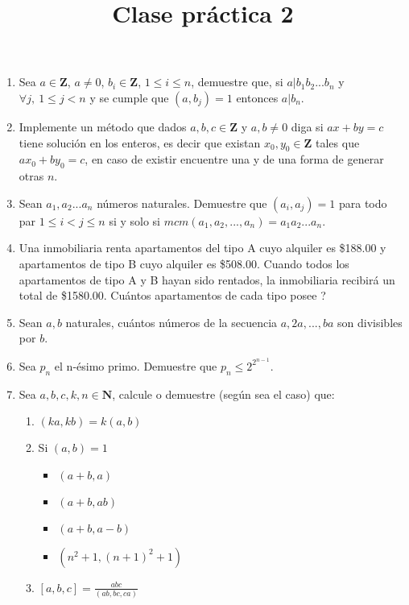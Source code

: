 \documentclass{article}
\begin{document}
\title{Clase pr\'actica 2}
\maketitle

\begin{enumerate}
    \item Sea $a \in \mathbf{Z}$, $a \neq 0$, $b_i \in \mathbf{Z}$, $1 \leq i \leq n$, demuestre que, si $a | b_1b_2...b_n$ y $\forall j,~ 1 \leq j < n$ y se cumple que $(a, b_j) = 1$ entonces $a | b_n$.
    \item Implemente un m\'etodo que dados $a,b,c \in \mathbf{Z}$ y $a,b \neq 0$ diga si $ax + by =c$ tiene soluci\'on en los enteros, es decir que existan $x_0, y_0 \in \mathbf{Z}$ tales que $ax_0 + by_0 = c$, en caso de existir encuentre una y de una forma de generar otras $n$.
    \item Sean $a_1, a_2 ... a_n$ n\'umeros naturales. Demuestre que $(a_i, a_j) = 1$ para todo par $1 \leq i < j \leq n$ si y solo si $mcm(a_1, a_2,...,a_n) = a_1a_2...a_n$.
    \item Una inmobiliaria renta apartamentos del tipo A cuyo alquiler es \$188.00 y apartamentos de tipo B cuyo alquiler es \$508.00. Cuando todos los apartamentos de tipo A y B hayan sido rentados, la inmobiliaria recibir\'a un total de \$1580.00. Cu\'antos apartamentos de cada tipo posee ?
    \item Sean $a,b$ naturales, cu\'antos n\'umeros de la secuencia $a, 2a, ..., ba$ son divisibles por $b$.
    \item Sea $p_n$ el n-\'esimo primo. Demuestre que $p_n \leq 2^{2^{n-1}}$.
    \item Sea $a,b,c,k,n \in \mathbf{N}$, calcule o demuestre (seg\'un sea el caso) que:
    \begin{enumerate}
        \item $(ka, kb) = k (a,b)$
        \item Si $(a,b) = 1$
        \begin{itemize}
            \item $(a+b, a)$
            \item $(a+b, ab)$
            \item $(a+b, a-b)$
            \item $(n^2 +1, (n+1)^2 +1)$
        \end{itemize}
        \item $[a,b,c] = \frac{abc}{(ab,bc,ca)}$
    \end{enumerate}
\end{enumerate}
\end{document}
